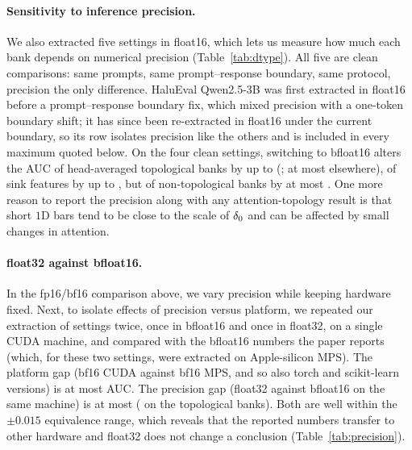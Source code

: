 \paragraph{Sensitivity to inference precision.} We also extracted five settings in float16, which lets us measure how much each bank depends on numerical precision (Table~\ref{tab:dtype}). All five are clean comparisons: same prompts, same prompt--response boundary, same protocol, precision the only difference. HaluEval Qwen2.5-3B was first extracted in float16 before a prompt--response boundary fix, which mixed precision with a one-token boundary shift; it has since been re-extracted in float16 under the current boundary, so its row isolates precision like the others and is included in every maximum quoted below. On the four clean settings, switching to bfloat16 alters the AUC of head-averaged topological banks by up to \DtypeTopoMax{} (\DtypeTopoWorst{}; at most \DtypeTopoOther{} elsewhere), of sink features by up to \DtypeSinkMax{}, but of non-topological banks by at most \DtypeNTMax{}. One more reason to report the precision along with any attention-topology result is that short $1$D bars tend to be close to the scale of $\delta_0$ and can be affected by small changes in attention.
\begin{table}[h]
\centering
\small
\caption{\textbf{AUC change from float16 to bfloat16} (same prompts and protocol). Every row isolates precision: same prompts, same prompt--response boundary, same protocol. The HaluEval Qwen2.5-3B row was re-extracted in float16 under the current boundary, its first float16 run having predated the boundary fix.}
\label{tab:dtype}
\resizebox{\linewidth}{!}{\SinkTableDtype}
\end{table}

\paragraph{float32 against bfloat16.} In the fp16/bf16 comparison above, we vary precision while keeping hardware fixed. Next, to isolate effects of precision versus platform, we repeated our extraction of \PrecSettings{} settings twice, once in bfloat16 and once in float32, on a single CUDA machine, and compared with the bfloat16 numbers the paper reports (which, for these two settings, were extracted on Apple-silicon MPS). The platform gap (bf16 CUDA against bf16 MPS, and so also torch and scikit-learn versions) is at most \PrecPlatformMax{} AUC. The precision gap (float32 against bfloat16 on the same machine) is at most \PrecFpMax{} (\PrecFpTopoMax{} on the topological banks). Both are well within the $\pm0.015$ equivalence range, which reveals that the reported numbers transfer to other hardware and float32 does not change a conclusion (Table~\ref{tab:precision}).
\begin{table}[h]
\centering
\small
\caption{\textbf{Platform and precision sensitivity} ($\Delta$AUC). ``bf16 CUDA $-$ bf16 MPS'' isolates hardware and library versions at fixed precision; ``fp32 $-$ bf16 (CUDA)'' isolates precision at fixed hardware.}
\label{tab:precision}
\resizebox{\linewidth}{!}{\SinkTablePrecision}
\end{table}

